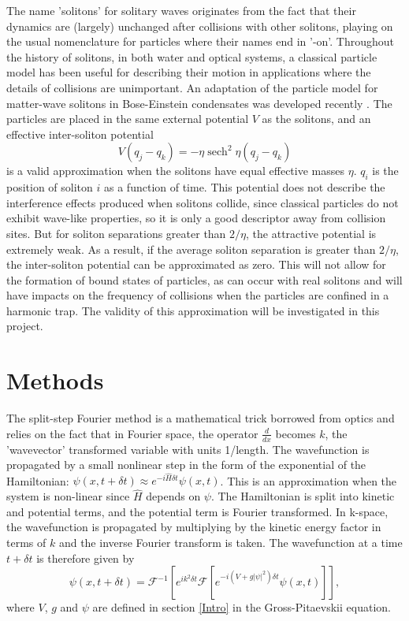 \documentclass[10pt, twocolumn]{revtex4}    %
\DeclareMathOperator{\sech}{sech}		%
\begin{document}
The name 'solitons' for solitary waves originates from the fact that their dynamics are (largely) unchanged after collisions with other solitons, playing on the usual nomenclature for particles where their names end in '-on'. Throughout the history of solitons, in both water and optical systems, a classical particle model has been useful for describing their motion in applications where the details of collisions are unimportant. An adaptation of the particle model for matter-wave solitons in Bose-Einstein condensates was developed recently \cite{Martin}. The particles are placed in the same external potential $V$ as the solitons, and an effective inter-soliton potential 
\begin{equation}
V(q_j - q_k) = -\eta \sech^2{\eta(q_j - q_k)}
\end{equation}
is a valid approximation when the solitons have equal effective masses $\eta$. $q_i$ is the position of soliton $i$ as a function of time. This potential does not describe the interference effects produced when solitons collide, since classical particles do not exhibit wave-like properties, so it is only a good descriptor away from collision sites. But for soliton separations greater than $2/\eta$, the attractive potential is extremely weak. As a result, if the average soliton separation is greater than $2/\eta$, the inter-soliton potential can be approximated as zero. This will not allow for the formation of bound states of particles, as can occur with real solitons \cite{Bound} and will have impacts on the frequency of collisions when the particles are confined in a harmonic trap. The validity of this approximation will be investigated in this project. 


\section{Methods} \label{Methods}

The split-step Fourier method is a mathematical trick borrowed from optics and relies on the fact that in Fourier space, the operator $\frac{d}{dx}$ becomes $k$, the 'wavevector' transformed variable with units 1/length. The wavefunction is propagated by a small nonlinear step in the form of the exponential of the Hamiltonian: $\psi(x,t+\delta t) \approx e^{-i\hat{H}\delta t} \psi(x,t)$. This is an approximation when the system is non-linear since $\hat{H}$ depends on $\psi$. The Hamiltonian is split into kinetic and potential terms, and the potential term is Fourier transformed. In k-space, the wavefunction is propagated by multiplying by the kinetic energy factor in terms of $k$ and the inverse Fourier transform is taken. The wavefunction at a time $t+\delta t$ is therefore given by
\begin{equation} \label{fft}
\psi(x,t+\delta t) = \mathcal{F}^{-1}[e^{ik^2 \delta t} \mathcal{F} [e^{-i(V+g|\psi|^2) \delta t} \psi(x,t) ] ],
\end{equation}
where $V$, $g$ and $\psi$ are defined in section \ref{Intro} in the Gross-Pitaevskii equation. 
\end{document}
